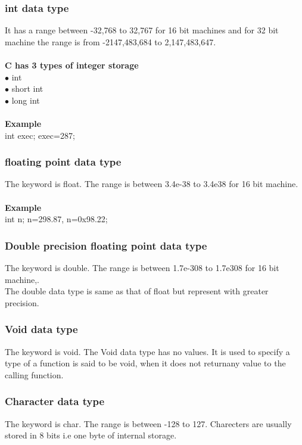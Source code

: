 \documentclass{article}
\begin{document}
	\subsubsection{int data type}
	It has a range between -32,768 to 32,767 for 16 bit machines and for 32 bit machine the range is from -2147,483,684 to 2,147,483,647.
	\\ \\
	\textbf{C has 3 types of integer storage} \\
	$\bullet$ int \\
	$\bullet$ short int \\
	$\bullet$ long int
	\\ \\
	\textbf{Example} \\
	int exec; exec=287;
	
	\subsubsection{floating point data type}
	The keyword is float. The range is between 3.4e-38 to 3.4e38 for 16 bit machine.
	\\ \\
	\textbf{Example} \\
	int n; n=298.87, n=0x98.22;
	
	\subsubsection{Double precision floating point data type}
	The keyword is double. The range is between 1.7e-308 to 1.7e308 for 16 bit machine,. \\
	The double data type is same as that of float but represent with greater precision.
	
	\subsubsection{Void data type}
	The keyword is void. The Void data type has no values. It is used to specify a type of a function is said to be void, when it does not returnany value to the calling function.
	
	\subsubsection{Character data type}
	The keyword is char. The range is between -128 to 127. Charecters are usually stored in 8 bits i.e one byte of internal storage.
	
\end{document}
